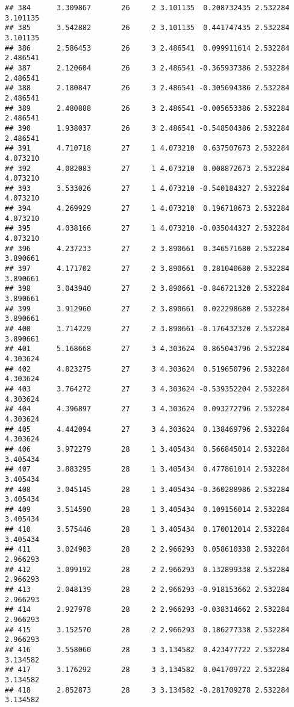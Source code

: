 \documentclass[]{book}
\theoremstyle{definition}
\theoremstyle{definition}
\theoremstyle{definition}
\theoremstyle{remark}
\begin{document}
\begin{verbatim}
## 384      3.309867       26     2 3.101135  0.208732435 2.532284 3.101135
## 385      3.542882       26     2 3.101135  0.441747435 2.532284 3.101135
## 386      2.586453       26     3 2.486541  0.099911614 2.532284 2.486541
## 387      2.120604       26     3 2.486541 -0.365937386 2.532284 2.486541
## 388      2.180847       26     3 2.486541 -0.305694386 2.532284 2.486541
## 389      2.480888       26     3 2.486541 -0.005653386 2.532284 2.486541
## 390      1.938037       26     3 2.486541 -0.548504386 2.532284 2.486541
## 391      4.710718       27     1 4.073210  0.637507673 2.532284 4.073210
## 392      4.082083       27     1 4.073210  0.008872673 2.532284 4.073210
## 393      3.533026       27     1 4.073210 -0.540184327 2.532284 4.073210
## 394      4.269929       27     1 4.073210  0.196718673 2.532284 4.073210
## 395      4.038166       27     1 4.073210 -0.035044327 2.532284 4.073210
## 396      4.237233       27     2 3.890661  0.346571680 2.532284 3.890661
## 397      4.171702       27     2 3.890661  0.281040680 2.532284 3.890661
## 398      3.043940       27     2 3.890661 -0.846721320 2.532284 3.890661
## 399      3.912960       27     2 3.890661  0.022298680 2.532284 3.890661
## 400      3.714229       27     2 3.890661 -0.176432320 2.532284 3.890661
## 401      5.168668       27     3 4.303624  0.865043796 2.532284 4.303624
## 402      4.823275       27     3 4.303624  0.519650796 2.532284 4.303624
## 403      3.764272       27     3 4.303624 -0.539352204 2.532284 4.303624
## 404      4.396897       27     3 4.303624  0.093272796 2.532284 4.303624
## 405      4.442094       27     3 4.303624  0.138469796 2.532284 4.303624
## 406      3.972279       28     1 3.405434  0.566845014 2.532284 3.405434
## 407      3.883295       28     1 3.405434  0.477861014 2.532284 3.405434
## 408      3.045145       28     1 3.405434 -0.360288986 2.532284 3.405434
## 409      3.514590       28     1 3.405434  0.109156014 2.532284 3.405434
## 410      3.575446       28     1 3.405434  0.170012014 2.532284 3.405434
## 411      3.024903       28     2 2.966293  0.058610338 2.532284 2.966293
## 412      3.099192       28     2 2.966293  0.132899338 2.532284 2.966293
## 413      2.048139       28     2 2.966293 -0.918153662 2.532284 2.966293
## 414      2.927978       28     2 2.966293 -0.038314662 2.532284 2.966293
## 415      3.152570       28     2 2.966293  0.186277338 2.532284 2.966293
## 416      3.558060       28     3 3.134582  0.423477722 2.532284 3.134582
## 417      3.176292       28     3 3.134582  0.041709722 2.532284 3.134582
## 418      2.852873       28     3 3.134582 -0.281709278 2.532284 3.134582

\end{verbatim}
\end{document}

